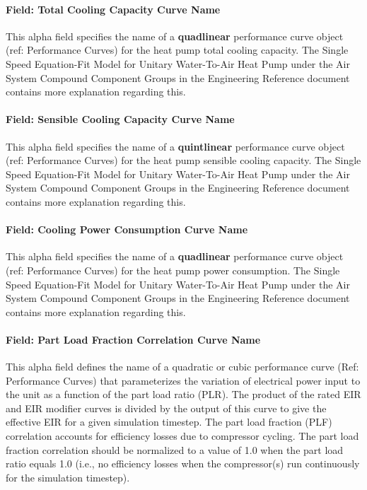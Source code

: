\paragraph{Field: Total Cooling Capacity Curve Name}\label{field-total-cooling-capacity-curve-name}

This alpha field specifies the name of a \textbf{quadlinear} performance curve object (ref: Performance Curves) for the heat pump total cooling capacity. The Single Speed Equation-Fit Model for Unitary Water-To-Air Heat Pump under the Air System Compound Component Groups in the Engineering Reference document contains more explanation regarding this.

\paragraph{Field: Sensible Cooling Capacity Curve Name}\label{field-sensible-cooling-capacity-curve-name}

This alpha field specifies the name of a \textbf{quintlinear} performance curve object (ref: Performance Curves) for the heat pump sensible cooling capacity. The Single Speed Equation-Fit Model for Unitary Water-To-Air Heat Pump under the Air System Compound Component Groups in the Engineering Reference document contains more explanation regarding this.

\paragraph{Field: Cooling Power Consumption Curve Name}\label{field-cooling-power-consumption-curve-name}

This alpha field specifies the name of a \textbf{quadlinear} performance curve object (ref: Performance Curves) for the heat pump power consumption. The Single Speed Equation-Fit Model for Unitary Water-To-Air Heat Pump under the Air System Compound Component Groups in the Engineering Reference document contains more explanation regarding this.

\paragraph{Field: Part Load Fraction Correlation Curve Name}\label{field-part-load-fraction-correlation-curve-name-efc}

This alpha field defines the name of a quadratic or cubic performance curve (Ref: Performance Curves) that parameterizes the variation of electrical power input to the unit as a function of the part load ratio (PLR). The product of the rated EIR and EIR modifier curves is divided by the output of this curve to give the effective EIR for a given simulation timestep. The part load fraction (PLF) correlation accounts for efficiency losses due to compressor cycling. The part load fraction correlation should be normalized to a value of 1.0 when the part load ratio equals 1.0 (i.e., no efficiency losses when the compressor(s) run continuously for the simulation timestep).

